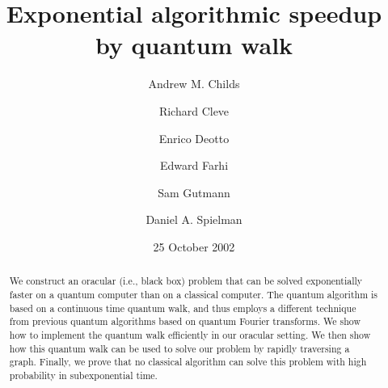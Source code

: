 \documentclass[aps,11pt,twoside,nofootinbib,tightenlines,superscriptaddress,preprintnumbers]{revtex4}
\newcommand{\<}{\langle}
\renewcommand{\>}{\rangle}
\begin{document}
\title{Exponential algorithmic speedup by quantum walk}

\author{Andrew M. Childs}

\author{Richard Cleve}

\author{Enrico Deotto}

\author{Edward Farhi}

\author{Sam Gutmann}

\author{Daniel A. Spielman}

\date[]{25 October 2002}



\begin{abstract}
We construct an oracular (i.e., black box) problem that can be solved
exponentially faster on a quantum computer than on a classical computer.
The quantum algorithm is based on a continuous time quantum walk, and thus
employs a different technique from previous quantum algorithms based on
quantum Fourier transforms.  We show how to implement the quantum walk
efficiently in our oracular setting. We then show how this quantum walk
can be used to solve our problem by rapidly traversing a graph.  Finally,
we prove that no classical algorithm can solve this problem with high
probability in subexponential time.
\end{abstract}

\maketitle
\end{document}
